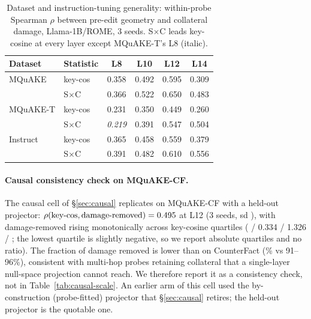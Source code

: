 \begin{table}[t]
\centering\small
\caption{Dataset and instruction-tuning generality: within-probe Spearman
$\rho$ between pre-edit geometry and collateral damage, Llama-1B/ROME, 3
seeds. S$\times$C leads key-cosine at every layer except MQuAKE-T's L8
(italic).}
\label{tab:datasetgen}
\setlength{\tabcolsep}{4pt}
\begin{tabular}{@{}llcccc@{}}
\toprule
Dataset & Statistic & L8 & L10 & L12 & L14 \\
\midrule
MQuAKE & key-cos & 0.358 & 0.492 & 0.595 & 0.309 \\
       & S$\times$C & 0.366 & 0.522 & 0.650 & 0.483 \\
MQuAKE-T & key-cos & 0.231 & 0.350 & 0.449 & 0.260 \\
         & S$\times$C & \emph{0.219} & 0.391 & 0.547 & 0.504 \\
Instruct & key-cos & 0.365 & 0.458 & 0.559 & 0.379 \\
         & S$\times$C & 0.391 & 0.482 & 0.610 & 0.556 \\
\bottomrule
\end{tabular}
\end{table}

\paragraph{Causal consistency check on MQuAKE-CF.} The causal cell of
\S\ref{sec:causal} replicates on MQuAKE-CF with a held-out projector:
$\rho(\text{key-cos}, \text{damage-removed}) = 0.495{}$ at L12 (3
seeds, sd \mquakeCausalRhoSD{}), with damage-removed rising monotonically
across key-cosine quartiles
(\mquakeCausalQuartLo{} / 0.334 / 1.326 / \mquakeCausalQuartHi{}; the lowest
quartile is slightly negative, so we report absolute quartiles and no ratio).
The fraction of damage removed is lower than on CounterFact
(\mquakeCausalFracRemoved{}\% vs 91--96\%), consistent with multi-hop probes
retaining collateral that a single-layer null-space projection cannot reach.
We therefore report it as a consistency check, not in
Table~\ref{tab:causal-scale}. An earlier arm of this cell used the
by-construction (probe-fitted) projector that \S\ref{sec:causal} retires; the
held-out projector is the quotable one.


